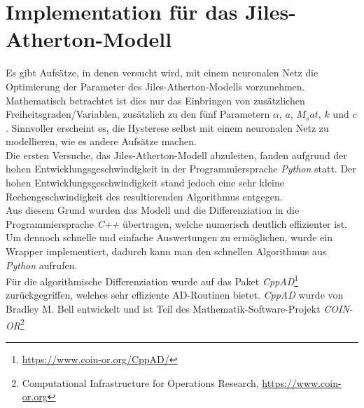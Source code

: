 \documentclass{scrartcl}
\begin{document}
\section{Implementation für das Jiles-Atherton-Modell}
Es gibt Aufsätze, in denen versucht wird, mit einem neuronalen Netz die Optimierung der Parameter des Jiles-Atherton-Modells vorzunehmen. Mathematisch betrachtet ist dies nur das Einbringen von zusätzlichen Freiheitsgraden/Variablen, zusätzlich zu den fünf Parametern $\alpha$, $a$, $M_sat$, $k$ und $c$. Sinnvoller erscheint es, die Hysterese selbst mit einem neuronalen Netz zu modellieren, wie es andere Aufsätze machen.\\
Die ersten Versuche, das Jiles-Atherton-Modell abzuleiten, fanden aufgrund der hohen Entwicklungsgeschwindigkeit in der Programmiersprache \emph{Python} statt. Der hohen Entwicklungsgeschwindigkeit stand jedoch eine sehr kleine Rechengeschwindigkeit des resultierenden Algorithmus entgegen.\\
Aus diesem Grund wurden das Modell und die Differenziation in die Programmiersprache \emph{C++} übertragen, welche numerisch deutlich effizienter ist. Um dennoch schnelle und einfache Auswertungen zu ermöglichen, wurde ein Wrapper implementiert, dadurch kann man den schnellen Algorithmus aus \emph{Python} aufrufen.\\
Für die algorithmische Differenziation wurde auf das Paket \emph{CppAD}\footnote{\url{https://www.coin-or.org/CppAD/}} zurückgegriffen, welches sehr effiziente AD-Routinen bietet. \emph{CppAD} wurde von Bradley M. Bell entwickelt und ist Teil des Mathematik-Software-Projekt \emph{COIN-OR}\footnote{Computational Infrastructure for Operations Research, \url{https://www.coin-or.org}}
\end{document}
